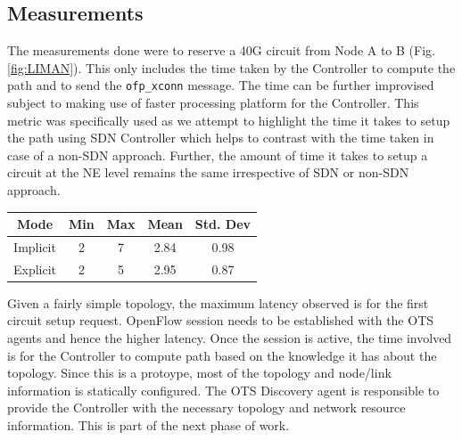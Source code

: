 \documentclass{sig-alternate-10pt}
\begin{document}
	\subsection{Measurements}
	\label{sec:measure}
	The measurements done were to reserve a 40G circuit from Node A to B (Fig. \ref{fig:LIMAN}). This only includes the time 
	taken by the Controller to compute the path and to send the \texttt{ofp\_xconn} message. The time can be further improvised
	subject to making use of faster processing platform for the Controller. This metric was specifically used as we attempt to highlight
	the time it takes to setup the path using SDN Controller which helps to contrast with the time taken in case of a non-SDN approach. 
	Further, the amount of time it takes to setup a circuit at the NE level remains the same irrespective of SDN or non-SDN approach.

	\begin{center}
		\begin{tabular} { | c |  c | c | c | c | }
			\hline
			 Mode & Min & Max & Mean & Std. Dev \\ \hline
			 Implicit & 2   &   7    & 2.84  & 0.98 \\
			 Explicit & 2   &   5    & 2.95  & 0.87 \\
			\hline
		\end{tabular}
		\label{tab:measurements}
	\end{center}

	Given a fairly simple topology, the maximum latency observed is for the first circuit setup request. OpenFlow session needs
	to be established with the OTS agents and hence the higher latency. Once the session is active, the time involved is for the
	Controller to compute path based on the knowledge it has about the topology. Since this is a protoype, most of the topology
	and node/link information is statically configured. The OTS Discovery agent is responsible to provide the Controller with the
	necessary topology and network resource information. This is part of the next phase of work.
\end{document}
